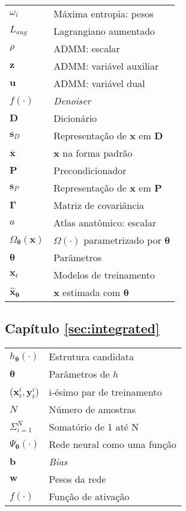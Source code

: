 \begin{multicols}{2}
\noindent\begin{tabular}{ m{1.3cm} m{6.2cm}}
$\omega_i$ & Máxima entropia: pesos \\ 
$L_{aug}$ &Lagrangiano aumentado \\ 
$\rho$ &ADMM: escalar  \\
$\mathbf{z}$ &ADMM: variável auxiliar  \\
$\mathbf{u}$ &ADMM: variável dual  \\
$ f(\cdot)$    & \textit{Denoiser}\\
$\mathbf{D}$ & Dicionário \\
$\mathbf{s}_D$ & Representação de $\bm{x}$ em $\mathbf{D}$ \\
$\overline{\mathbf{x}}$ & $\mathbf{x}$ na forma padrão\\
$\mathbf{P}$ & Precondicionador \\
$\mathbf{s}_P$ & Representação de $\bm{x}$ em $\mathbf{P}$ \\
$\mathbf{\Gamma}$ & Matriz de covariância \\
$a$ & Atlas anatômico: escalar \\
$\Omega_{\bm{\theta}}(\mathbf{x})$ & $\Omega(\cdot)$ parametrizado por $\bm{\theta}$\\
$\bm{\theta}$ & Parâmetros\\
$\mathbf{x}_t$ & Modelos de treinamento\\
$\hat{\mathbf{x}}_{\bm{\theta}}$ & $\mathbf{x}$ estimada com  $\bm{\theta}$ \\
\end{tabular}

\vfill\null
\columnbreak

\subsection*{Capítulo \ref{sec:integrated}}
\noindent\begin{tabular}{ m{1.3cm} m{6.2cm}}
  $h_{\bm{\theta}}( \cdot)$ & Estrutura candidata \\
  $\bm{\theta}$ & Parâmetros de $h$\\
 ($\mathbf{x}_t^{i}, \mathbf{y}_t^{i}$) & i-ésimo par de treinamento\\
 $N$ &Número de amostras \\
 $\Sigma_{i=1}^N$ &Somatório de 1 até N  \\
 $\Psi_{\bm{\theta}}(\cdot)$  & Rede neural como uma função\\
 $\mathbf{b}$ & \textit{Bias} \\
$\mathbf{w}$ & Pesos da rede\\
$ f(\cdot)$    & Função de ativação\\
\end{tabular}


\end{multicols}
